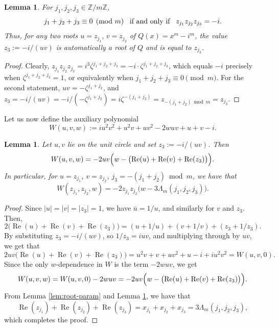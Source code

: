 \documentclass[11pt,reqno]{amsart}
\newtheorem{lemma}[theorem]{Lemma}
\theoremstyle{remark}
\begin{document}
\begin{lemma}
\label{lem:constraint-product}
For $j_1,j_2,j_3\in\mathbb Z/m\mathbb Z$,
\[
j_1+j_2+j_3\equiv0\pmod m
\,\,\,\,\,
\text{\rm if and only if}
\,\,\,\,\,
 z_{j_1}z_{j_2}z_{j_3}=-i.
\]
Thus, for any two roots $u=z_{j_1},\,v=z_{j_2}$ of $Q(x)=x^m-i^m$,
the value $z_3:=-i/(uv)$ is automatically a root of $Q$ and is equal to
$z_{j_3}$.
\end{lemma}

\begin{proof} Clearly,
$z_{j_1}z_{j_2}z_{j_3}=i^3\zeta^{j_1+j_2+j_3}=-i\cdot\zeta^{j_1+j_2+j_3}$,
which equals $-i$ precisely when $\zeta^{j_1+j_2+j_3}=1$, or equivalently when
$j_1+j_2+j_3\equiv0\pmod m$. For the second statement,  $uv=-\zeta^{j_1+j_2}$,
and
$z_3=-i/(uv)=-i/(-\zeta^{j_1+j_2})=i\zeta^{-(j_1+j_2)}=z_{-(j_1+j_2)\bmod m}=z_{j_3}$.
\end{proof}

Let us now define the auxiliary polynomial
\begin{equation}
\label{eq:Wdef}
W(u,v,w) := iu^2v^2+u^2v+uv^2-2wuv+u+v-i.
\end{equation}

\begin{lemma}\label{lemma W}
Let $u, v$ lie on the unit circle and set $z_3 := -i/(uv)$. Then
\[
W(u,v,w) = -2uv\Bigl(w - \bigl(\operatorname{Re}(u)+\operatorname{Re}(v)+\operatorname{Re}(z_3)\bigr)\Bigr).
\]
In particular, for $u = z_{j_1}$, $v = z_{j_2}$, $j_3 = -(j_1+j_2) \bmod m$, we have that
\[
W(z_{j_1}, z_{j_2}, w) = -2z_{j_1}z_{j_2}\bigl(w - 3\Lambda_{m}(j_1,j_2,j_3)\bigr).
\]
\end{lemma}

\begin{proof}
Since $|u|=|v|=|z_3|=1$, we have $\bar u = 1/u$, and similarly for $v$ and $z_{3}$.  Then,
$$
2\bigl(\operatorname{Re}(u)+\operatorname{Re}(v)+\operatorname{Re}(z_3)\bigr) = (u+1/u)+(v+1/v)+(z_3+1/z_3).
$$
By substituting $z_3 = -i/(uv)$, so $1/z_3 = iuv$, and multiplying through by $uv$, we get that
\[
2uv\bigl(\operatorname{Re}(u)+\operatorname{Re}(v)+\operatorname{Re}(z_3)\bigr)
= u^2v+v+uv^2+u-i+iu^2v^2 = W(u,v,0).
\]
Since the only $w$-dependence in $W$ is the term $-2wuv$, we get
\[
W(u,v,w) = W(u,v,0) - 2wuv = -2uv\Bigl(w - \bigl(\operatorname{Re}(u)+\operatorname{Re}(v)+\operatorname{Re}(z_3)\bigr)\Bigr).
\]
From Lemma \ref{lem:root-param} and Lemma \ref{lem:constraint-product}, we have that
$$
\operatorname{Re}(z_{j_1})+\operatorname{Re}(z_{j_2})+\operatorname{Re}(z_{j_3}) = x_{j_1}+x_{j_2}+x_{j_3} = 3\Lambda_{m}(j_1,j_2,j_3),
$$
which completes the proof.
\end{proof}
\end{document}
